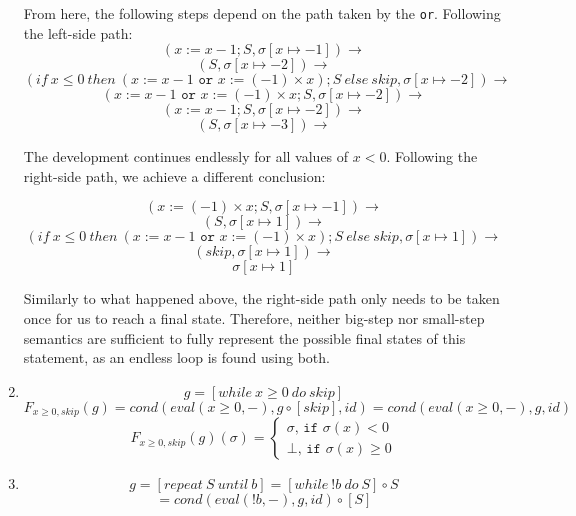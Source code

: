 \documentclass[11pt]{article}
\begin{document}
\begin{enumerate}
		
		From here, the following steps depend on the path taken by the \texttt{or}. Following the left-side path:
		$$
		(x:=x-1; S,\sigma[x\mapsto-1]) \rightarrow 
		$$
		$$
		(S,\sigma[x\mapsto-2]) \rightarrow 
		$$
		$$
		(if\ x\leq 0\ then\ (x:=x-1\texttt{ or }x:= (-1)\times x); S\ else\ skip,\sigma[x\mapsto-2]) \rightarrow
		$$
		$$
		(x:=x-1\texttt{ or }x:= (-1)\times x; S,\sigma[x\mapsto-2]) \rightarrow
		$$
		$$
		(x:=x-1; S,\sigma[x\mapsto-2]) \rightarrow 
		$$
		$$
		(S,\sigma[x\mapsto-3]) \rightarrow
		$$
		
		The development continues endlessly for all values of $x < 0$. Following the right-side path, we achieve a different conclusion:
		
		$$
		(x:=(-1)\times x; S,\sigma[x\mapsto-1]) \rightarrow 
		$$
		$$
		(S,\sigma[x\mapsto1]) \rightarrow
		$$
		$$
		(if\ x\leq 0\ then\ (x:=x-1\texttt{ or }x:= (-1)\times x); S\ else\ skip,\sigma[x\mapsto1]) \rightarrow
		$$
		$$
		(skip,\sigma[x\mapsto1]) \rightarrow
		$$
		$$
		\sigma[x\mapsto 1]
		$$
		
		Similarly to what happened above, the right-side path only needs to be taken once for us to reach a final state.
		Therefore, neither big-step nor small-step semantics are sufficient to fully represent the possible final states of this statement, as an endless loop is found using both.
		
	\item 
	\begin{equation}
		g=[while\ x\geq 0\ do\ skip]
	\end{equation}
	\begin{equation}
		F_{x\geq 0,skip}(g) = cond(eval(x\geq 0,-), g\circ [skip], id) = cond(eval(x\geq0,-),g,id)
	\end{equation}
	\begin{equation}
		F_{x\geq 0,skip}(g)(\sigma) = \begin{cases}\sigma\texttt{, if }\sigma(x)<0 \\ \bot\texttt{, if }\sigma(x) \geq 0\end{cases}
	\end{equation}
	
	\item 
	\begin{equation}
		g=[repeat\ S\ until\ b]=[while\ !b\ do\ S]\circ S
	\end{equation}
	\begin{equation}
		[repeat\ S\ until\ b]=cond(eval(!b,-), g, id)\circ [S]
	\end{equation}
		
	\end{enumerate}
\end{document}
